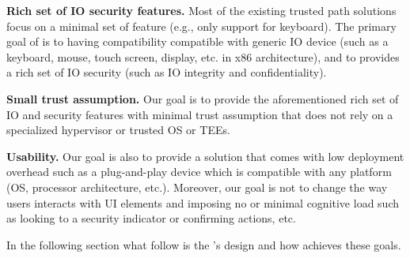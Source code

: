 \begin{mylist}
  \item  \textbf{Rich set of IO security features.} Most of the existing trusted path solutions focus on a minimal set of feature (e.g., only support for keyboard). The primary goal of \name is to having compatibility compatible with generic IO device (such as a keyboard, mouse, touch screen, display, etc. in x86 architecture), and to provides a rich set of IO security (such as IO integrity and confidentiality). 
  
  \item  \textbf{Small trust assumption.} Our goal is to provide the aforementioned rich set of IO and security features with minimal trust assumption that does not rely on a specialized hypervisor or trusted OS or TEEs. %
  
  \item \textbf{Usability.} Our goal is also to provide a solution that comes with low deployment overhead such as a plug-and-play device which is compatible with any platform (OS, processor architecture, etc.). Moreover, our goal is not to change the way users interacts with UI elements and imposing no or minimal cognitive load such as looking to a security indicator or confirming actions, etc. 
\end{mylist}

In the following section what follow is the \name's design and how \name achieves these goals.


